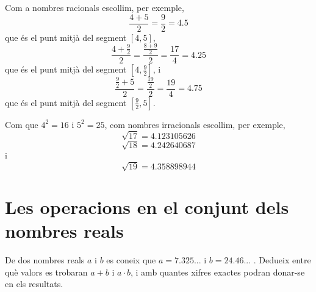 \begin{solucio}
Com a nombres racionals escollim, per exemple,%
\begin{equation*}
\frac{4+5}{2}=\frac{9}{2}=4.5
\end{equation*}%
que és el punt mitjà del segment $[4,5]$,%
\begin{equation*}
\frac{4+\frac{9}{2}}{2}=\frac{\frac{8+9}{2}}{2}=\frac{17}{4}=4.25
\end{equation*}%
que és el punt mitjà del segment $[4,\frac{9}{2}]$, i%
\begin{equation*}
\frac{\frac{9}{2}+5}{2}=\frac{\frac{19}{2}}{2}=\frac{19}{4}=4.75
\end{equation*}%
que és el punt mitjà del segment $[\frac{9}{2},5]$.

Com que $4^{2}=16$ i $5^{2}=25$, com nombres irracionals escollim,
per exemple,%
\begin{equation*}
\sqrt{17}=4.123105626
\end{equation*}%
\begin{equation*}
\sqrt{18}=4.242640687
\end{equation*}%
i%
\begin{equation*}
\sqrt{19}=4.358898944
\end{equation*}
\end{solucio}

\section{Les operacions en el conjunt dels nombres reals}

\begin{exercici}
De dos nombres reals $a$ i $b$ es coneix que $a=7.325...$ i $b=24.46...$%
. Dedueix entre què valors es trobaran $a+b$ i $a\cdot b$, i amb quantes xifres exactes podran donar-se en els resultats.

\end{exercici}

